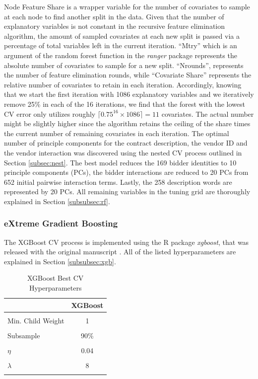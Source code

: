 \documentclass[a4paper,12pt, headsepline]{scrartcl}
\numberwithin{equation}{section}
\begin{document}
Node Feature Share is a wrapper variable for the number of covariates to sample at each node to find another split in the data. Given that the number of explanatory variables is not constant in the recursive feature elimination algorithm, the amount of sampled covariates at each new split is passed via a percentage of total variables left in the current iteration. \enquote{Mtry} which is an argument of the random forest function in the \textit{ranger} package represents the absolute number of covariates to sample for a new split. \enquote{Nrounds}, represents the number of feature elimination rounds, while \enquote{Covariate Share} represents the relative number of covariates to retain in each iteration. Accordingly, knowing that we start the first iteration with 1086 explanatory variables and we iteratively remove 25\% in each of the 16 iterations, we find that the forest with the lowest CV error only utilizes roughly $\lceil 0.75^{16} \times 1086\rceil = 11$ covariates. The actual number might be slightly higher since the algorithm retains the ceiling of the share times the current number of remaining covariates in each iteration. The optimal number of principle components for the contract description, the vendor ID and the vendor interaction was discovered using the nested CV process outlined in Section \ref{subsec:nest}. The best model reduces the 169 bidder identities to 10 principle components (PCs), the bidder interactions are reduced to 20 PCs from 652 initial pairwise interaction terms. Lastly, the 258 description words are represented by 20 PCs. All remaining variables in the tuning grid are thoroughly explained in Section \ref{subsubsec:rf}.

\subsubsection{eXtreme Gradient Boosting}
The XGBoost CV process is implemented using the R package \textit{xgboost}, that was released with the original manuscript \citep{xgboost}. All of the listed hyperparameters are explained in Section \ref{subsubsec:xgb}.

\begin{table}[H]
	\centering
	\begin{tabular}[t]{lc}
		\toprule
		& XGBoost\\
		\midrule
		\cellcolor{gray!6}{$N_{iter}$} & \cellcolor{gray!6}{338}\\
		Min. Child Weight & 1\\
		\cellcolor{gray!6}{Max. Depth} & \cellcolor{gray!6}{7}\\
		Subsample & 90\%\\
		\cellcolor{gray!6}{Colsample by Tree} & \cellcolor{gray!6}{90\%}\\
		$\eta$ & 0.04\\
		\cellcolor{gray!6}{$\gamma$} & \cellcolor{gray!6}{0.01}\\
		$\lambda$ & 8\\
		\cellcolor{gray!6}{$\alpha$} & \cellcolor{gray!6}{3}\\
		\bottomrule
	\end{tabular}
	\caption{XGBoost Best CV Hyperparameters}\label{tab:xgb}
\end{table}
\end{document}
